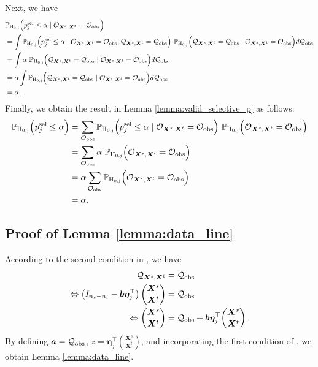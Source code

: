 Next, we have 
%
\begin{align*}
	&\mathbb{P}_{\rm H_{0, j}}  \Big (p_j^{\rm sel} \leq \alpha \mid {\mathcal O}_{\bm X^s, \bm X^t} = {\mathcal O}_{\rm obs} \Big ) \\ 
	&= 
	\int
	\mathbb{P}_{\rm H_{0, j}}  \Big (p_j^{\rm sel} \leq \alpha \mid {\mathcal O}_{\bm X^s, \bm X^t} = {\mathcal O}_{\rm obs},  {\mathcal Q}_{\bm X^s, \bm X^t} = {\mathcal Q}_{\rm obs} \Big ) ~
	\mathbb{P}_{\rm H_{0, j}}  \Big ({\mathcal Q}_{\bm X^s, \bm X^t} = {\mathcal Q}_{\rm obs} \mid {\mathcal O}_{\bm X^s, \bm X^t} = {\mathcal O}_{\rm obs} \Big ) d{\mathcal Q}_{\rm obs} \\ 
	&= 
	\int \alpha 
	~ \mathbb{P}_{\rm H_{0, j}}  \Big ({\mathcal Q}_{\bm X^s, \bm X^t} = {\mathcal Q}_{\rm obs} \mid {\mathcal O}_{\bm X^s, \bm X^t} = {\mathcal O}_{\rm obs} \Big ) d{\mathcal Q}_{\rm obs} \\ 
	& = 
	\alpha 
	\int \mathbb{P}_{\rm H_{0, j}}  \Big ({\mathcal Q}_{\bm X^s, \bm X^t} = {\mathcal Q}_{\rm obs} \mid {\mathcal O}_{\bm X^s, \bm X^t} = {\mathcal O}_{\rm obs} \Big ) d{\mathcal Q}_{\rm obs} \\ 
	& = 
	\alpha.
\end{align*} 
%
Finally, we obtain the result in Lemma \ref{lemma:valid_selective_p} as follows:
%
\begin{align*}
	\mathbb{P}_{\rm H_{0, j}}  \Big (p_j^{\rm sel} \leq \alpha \Big ) 
	& = \sum \limits_{{\mathcal O}_{\rm obs}}
	\mathbb{P}_{\rm H_{0, j}}  \Big (p_j^{\rm sel} \leq \alpha \mid {\mathcal O}_{\bm X^s, \bm X^t} = {\mathcal O}_{\rm obs} \Big ) ~
	\mathbb{P}_{\rm H_{0, j}}  \Big ({\mathcal O}_{\bm X^s, \bm X^t} = {\mathcal O}_{\rm obs} \Big ) \\ 
	& = \sum \limits_{{\mathcal O}_{\rm obs}} \alpha ~ \mathbb{P}_{\rm H_{0, j}}  \Big ({\mathcal O}_{\bm X^s, \bm X^t} = {\mathcal O}_{\rm obs} \Big ) \\ 
	& = \alpha \sum \limits_{{\mathcal O}_{\rm obs}} \mathbb{P}_{\rm H_{0, j}}  \Big ({\mathcal O}_{\bm X^s, \bm X^t} = {\mathcal O}_{\rm obs} \Big ) \\ 
	& = \alpha.
\end{align*}




\subsection{Proof of Lemma \ref{lemma:data_line}} \label{appx:proof_lemma_data_line}

According to the second condition in , we have 
%
\begin{align*}
	{\mathcal Q}_{\bm X^s, \bm X^t} & =  {\mathcal Q}_{\rm obs} \\ 
	\Leftrightarrow 
	\left ( 
	I_{n_s + n_t} - 
	\bm b
	\bm \eta_j^\top \right ) 
	{\bm X^s \choose \bm X^t}
	& = 
	{\mathcal Q}_{\rm obs}\\ 
	\Leftrightarrow 
	{\bm X^s \choose \bm X^t}
	& = 
	{\mathcal Q}_{\rm obs}
	+ \bm b
	\bm \eta_j^\top  
	{\bm X^s \choose \bm X^t}.
\end{align*}
%
By defining 
$\bm a = {\mathcal Q}_{\rm obs}$,
$z = \bm \eta_j^\top {\bm X^s \choose \bm X^t}$, and incorporating the first condition of , we obtain Lemma \ref{lemma:data_line}. 



